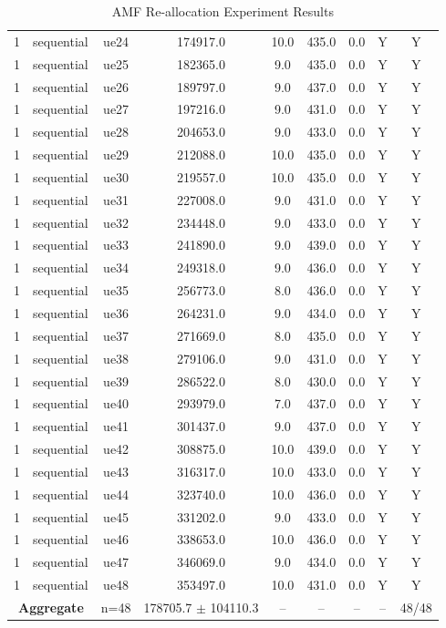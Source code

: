 \begin{table}[ht]
\begin{tabular}{|c|c|c|c|c|c|c|c|c|}
1 & sequential & ue24 & 174917.0 & 10.0 & 435.0 & 0.0 & Y & Y \\
1 & sequential & ue25 & 182365.0 & 9.0 & 435.0 & 0.0 & Y & Y \\
1 & sequential & ue26 & 189797.0 & 9.0 & 437.0 & 0.0 & Y & Y \\
1 & sequential & ue27 & 197216.0 & 9.0 & 431.0 & 0.0 & Y & Y \\
1 & sequential & ue28 & 204653.0 & 9.0 & 433.0 & 0.0 & Y & Y \\
1 & sequential & ue29 & 212088.0 & 10.0 & 435.0 & 0.0 & Y & Y \\
1 & sequential & ue30 & 219557.0 & 10.0 & 435.0 & 0.0 & Y & Y \\
1 & sequential & ue31 & 227008.0 & 9.0 & 431.0 & 0.0 & Y & Y \\
1 & sequential & ue32 & 234448.0 & 9.0 & 433.0 & 0.0 & Y & Y \\
1 & sequential & ue33 & 241890.0 & 9.0 & 439.0 & 0.0 & Y & Y \\
1 & sequential & ue34 & 249318.0 & 9.0 & 436.0 & 0.0 & Y & Y \\
1 & sequential & ue35 & 256773.0 & 8.0 & 436.0 & 0.0 & Y & Y \\
1 & sequential & ue36 & 264231.0 & 9.0 & 434.0 & 0.0 & Y & Y \\
1 & sequential & ue37 & 271669.0 & 8.0 & 435.0 & 0.0 & Y & Y \\
1 & sequential & ue38 & 279106.0 & 9.0 & 431.0 & 0.0 & Y & Y \\
1 & sequential & ue39 & 286522.0 & 8.0 & 430.0 & 0.0 & Y & Y \\
1 & sequential & ue40 & 293979.0 & 7.0 & 437.0 & 0.0 & Y & Y \\
1 & sequential & ue41 & 301437.0 & 9.0 & 437.0 & 0.0 & Y & Y \\
1 & sequential & ue42 & 308875.0 & 10.0 & 439.0 & 0.0 & Y & Y \\
1 & sequential & ue43 & 316317.0 & 10.0 & 433.0 & 0.0 & Y & Y \\
1 & sequential & ue44 & 323740.0 & 10.0 & 436.0 & 0.0 & Y & Y \\
1 & sequential & ue45 & 331202.0 & 9.0 & 433.0 & 0.0 & Y & Y \\
1 & sequential & ue46 & 338653.0 & 10.0 & 436.0 & 0.0 & Y & Y \\
1 & sequential & ue47 & 346069.0 & 9.0 & 434.0 & 0.0 & Y & Y \\
1 & sequential & ue48 & 353497.0 & 10.0 & 431.0 & 0.0 & Y & Y \\
\multicolumn{2}{|c|}{\textbf{Aggregate}} & n=48 & 178705.7 $\pm$ 104110.3 & -- & -- & -- & -- & 48/48 \\
\hline
\end{tabular}
\caption{AMF Re-allocation Experiment Results}
\label{tab:amf_realloc}
\end{table}
